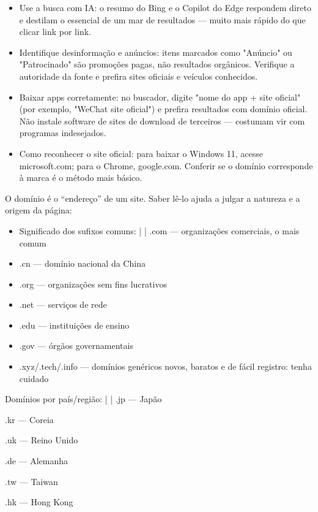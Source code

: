 
\begin{itemize}
  \item Use a busca com IA: o resumo do Bing e o Copilot do Edge respondem direto e destilam o essencial de um mar de resultados — muito mais rápido do que clicar link por link.
  \item Identifique desinformação e anúncios: itens marcados como "Anúncio" ou "Patrocinado" são promoções pagas, não resultados orgânicos. Verifique a autoridade da fonte e prefira sites oficiais e veículos conhecidos.
  \item Baixar apps corretamente: no buscador, digite "nome do app + site oficial" (por exemplo, "WeChat site oficial") e prefira resultados com domínio oficial. Não instale software de sites de download de terceiros — costumam vir com programas indesejados.
  \item Como reconhecer o site oficial: para baixar o Windows 11, acesse microsoft.com; para o Chrome, google.com. Conferir se o domínio corresponde à marca é o método mais básico.
\end{itemize}


O domínio é o “endereço” de um site. Saber lê-lo ajuda a julgar a natureza e a origem da página:

\begin{itemize}
  \item Significado dos sufixos comuns: | | .com — organizações comerciais, o mais comum
  \item .cn — domínio nacional da China
  \item .org — organizações sem fins lucrativos
  \item .net — serviços de rede
  \item .edu — instituições de ensino
  \item .gov — órgãos governamentais
  \item .xyz/.tech/.info — domínios genéricos novos, baratos e de fácil registro: tenha cuidado
\end{itemize}

Domínios por país/região: | | .jp — Japão

.kr — Coreia

.uk — Reino Unido

.de — Alemanha

.tw — Taiwan

.hk — Hong Kong

